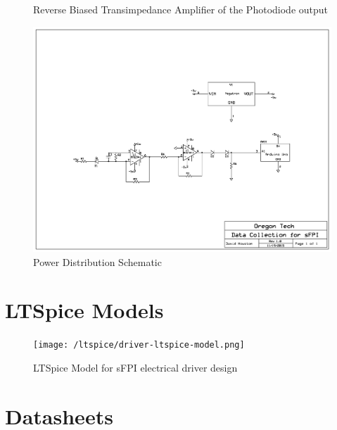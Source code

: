 \documentclass[12pt,journal]{IEEEtran}
\begin{document}
\begin{appendices}
\begin{figure}[h!]
	\caption[Photodiode Output Circuit]{Reverse Biased Transimpedance Amplifier of the Photodiode output}
	\label{schm:photodiode}
\end{figure}
\newpage
\begin{figure}[h!]
	\centering
	\includegraphics[width=\textwidth]{schematic-power.png}
	\caption[Photodiode Output Circuit]{Power Distribution Schematic}
	\label{schm:power-distribution}
\end{figure}
\newpage

\section{LTSpice Models} \label{ss:ltpsice-models}

\begin{figure}[h!]
	\centering
	\texttt{[image: /ltspice/driver-ltspice-model.png]}
	\caption{LTSpice Model for sFPI electrical driver design}
	\label{ltpsice:driver}
\end{figure}

\newpage

\section{Datasheets}

%

%

 \label{datasheet:nte941m}

 \label{datasheet:nte957}

 \label{datasheet:mcp4725}

 \label{datasheet:arduino_uno}

 \label{datasheet:psin02512n}

\end{appendices}
\end{document}
